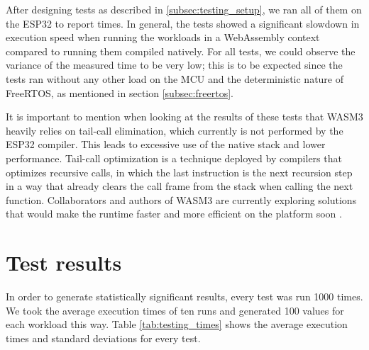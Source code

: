 After designing tests as described in \ref{subsec:testing_setup}, we ran all of them on the ESP32 to report times. In general, the tests showed a significant slowdown in execution speed when running the workloads in a WebAssembly context compared to running them compiled natively. For all tests, we could observe the variance of the measured time to be very low; this is to be expected since the tests ran without any other load on the MCU and the deterministic nature of FreeRTOS, as mentioned in section \ref{subsec:freertos}.

It is important to mention when looking at the results of these tests that WASM3 heavily relies on tail-call elimination, which currently is not performed by the ESP32 compiler. This leads to excessive use of the native stack and lower performance. Tail-call optimization is a technique deployed by compilers that optimizes recursive calls, in which the last instruction is the next recursion step in a way that already clears the call frame from the stack when calling the next function. Collaborators and authors of WASM3 are currently exploring solutions that would make the runtime faster and more efficient on the platform soon \autocite{grokhotkov_esp32-idf_nodate}.

\section{Test results}

In order to generate statistically significant results, every test was run 1000 times. We took the average execution times of ten runs and generated 100 values for each workload this way. Table \ref{tab:testing_times} shows the average execution times and standard deviations for every test.

